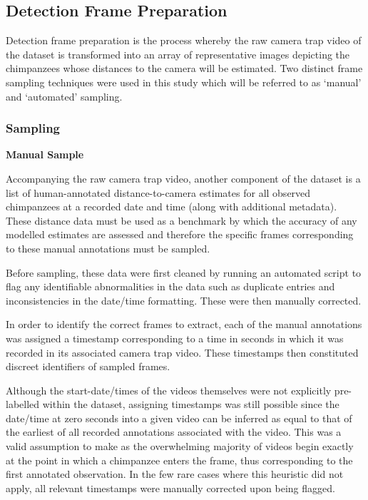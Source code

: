 \subsection{Detection Frame Preparation}

Detection frame preparation is the process whereby the raw camera trap video of the dataset
is transformed into an array of representative images depicting the chimpanzees whose
distances to the camera will be estimated.
Two distinct frame sampling techniques were used in this study which will be referred to as
`manual' and `automated' sampling.

\vspace{-3mm}

\subsubsection{Sampling}\label{subsubsec:sampling}

\textbf{Manual Sample}

Accompanying the raw camera trap video, another component of the dataset is a list of
human-annotated distance-to-camera estimates for all observed chimpanzees at a recorded
date and time (along with additional metadata).
These distance data must be used as a benchmark by which the accuracy of any modelled estimates
are assessed and therefore the specific frames corresponding to these manual annotations must
be sampled.

Before sampling, these data were first cleaned by running an automated script to flag any
identifiable abnormalities in the data such as duplicate entries and inconsistencies in the
date/time formatting.
These were then manually corrected.

In order to identify the correct frames to extract, each of the manual annotations was assigned
a timestamp corresponding to a time in seconds in which it was recorded in its associated camera
trap video.
These timestamps then constituted discreet identifiers of sampled frames.

Although the start-date/times of the videos themselves were not explicitly pre-labelled within
the dataset, assigning timestamps was still possible since the date/time at zero seconds into
a given video can be inferred as equal to that of the earliest of all recorded annotations
associated with the video.
This was a valid assumption to make as the overwhelming majority of videos begin exactly at the
point in which a chimpanzee enters the frame, thus corresponding to the first annotated observation.
In the few rare cases where this heuristic did not apply, all relevant timestamps were manually
corrected upon being flagged.


